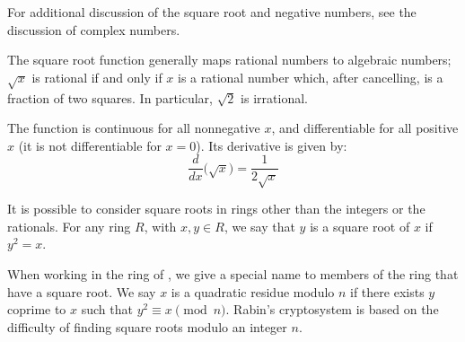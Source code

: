 \documentclass[12pt]{article}
\theoremstyle{definition}
\begin{document}
For additional discussion of the square root and negative numbers, see the discussion of complex numbers.

The square root function generally maps rational numbers to algebraic numbers; $\sqrt{x}$ is rational if and only if $x$ is a rational number which, after cancelling, is a fraction of two  squares.  In particular, $\sqrt{2}$ is irrational. 

The function is continuous for all nonnegative $x$, and differentiable for all positive $x$ (it is not differentiable for $x=0$). Its derivative is given by:
\[
\frac{d}{dx}\big(\sqrt{x}\big)=\frac{1}{2\sqrt{x}}
\]

It is possible to consider square roots in rings other than the integers or the rationals. For any ring $R$, with $x,y\in R$, we say that $y$ is a square root of $x$ if $y^2=x$. 

When working in the ring of , we give a special name to members of the ring that have a square root. We say $x$ is a quadratic residue modulo $n$ if there exists $y$ coprime to $x$ such that $y^2\equiv x\pmod{n}$. Rabin's cryptosystem is based on the difficulty of finding square roots modulo an integer $n$.
\end{document}
